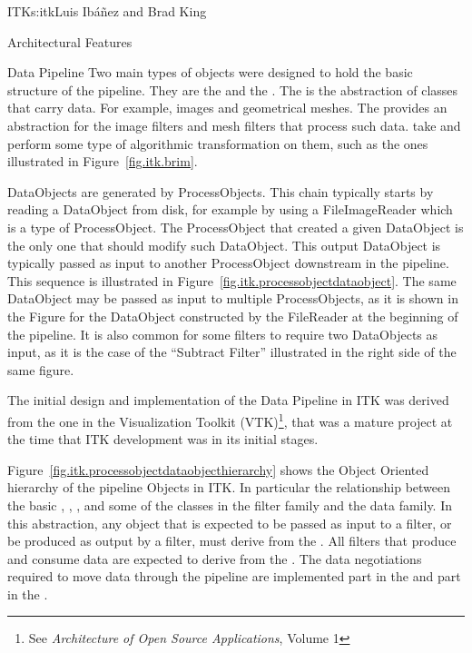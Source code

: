 \begin{aosachapter}{ITK}{s:itk}{Luis Ib\'{a}\~{n}ez and Brad King}
\begin{aosasect1}{Architectural Features}
\begin{aosasect2}{Data Pipeline}
Two main types of objects were designed to hold the basic structure of the
pipeline.  They are the  and the . The
 is the abstraction of classes that carry data. For example,
images and geometrical meshes. The  provides an abstraction
for the image filters and mesh filters that process such data.
 take  and perform some type of
algorithmic transformation on them, such as the ones illustrated
in Figure~\ref{fig.itk.brim}.


DataObjects are generated by ProcessObjects. This chain typically starts by
reading a DataObject from disk, for example by using a FileImageReader which is
a type of ProcessObject. The ProcessObject that created a given DataObject is
the only one that should modify such DataObject. This output DataObject is
typically passed as input to another ProcessObject downstream in the pipeline.
This sequence is illustrated in Figure~\ref{fig.itk.processobjectdataobject}.
The same DataObject may be passed as input to multiple ProcessObjects, as it is
shown in the Figure for the DataObject constructed by the FileReader at the
beginning of the pipeline. It is also common for some filters to require two
DataObjects as input, as it is the case of the ``Subtract Filter'' illustrated
in the right side of the same figure.

The initial design and implementation of the Data Pipeline in ITK was derived
from the one in the Visualization Toolkit (VTK)\footnote{See \emph{Architecture
of Open Source Applications}, Volume 1}, that was a mature project at the time
that ITK development was in its initial stages.

Figure~\ref{fig.itk.processobjectdataobjecthierarchy} shows the Object Oriented
hierarchy of the pipeline Objects in ITK. In particular the relationship
between the basic , , , and
some of the classes in the filter family and the data family. In this
abstraction, any object that is expected to be passed as input to a filter, or
be produced as output by a filter, must derive from the . All
filters that produce and consume data are expected to derive from the
. The data negotiations required to move data through the
pipeline are implemented part in the  and part in the
.


\end{aosasect2}
\end{aosasect1}
\end{aosachapter}
